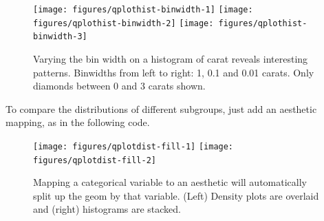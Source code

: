 \begin{Shaded}
\begin{Highlighting}[]
  \NormalTok{, } \NormalTok{, }
   \NormalTok{(}\NormalTok{,}\NormalTok{))}
  \NormalTok{, } \NormalTok{,}
   \NormalTok{(}\NormalTok{,}\NormalTok{))}
  \NormalTok{, } \NormalTok{,}
   \NormalTok{(}\NormalTok{,}\NormalTok{))}
\end{Highlighting}
\end{Shaded}

\begin{figure}
\texttt{[image: figures/qplothist-binwidth-1]} \texttt{[image: figures/qplothist-binwidth-2]} \texttt{[image: figures/qplothist-binwidth-3]} \caption{Varying the bin width on a histogram of carat reveals interesting patterns.  Binwidths from left to right: 1, 0.1 and 0.01 carats. Only diamonds between 0 and 3 carats shown.\label{fig:hist-binwidth}}
\end{figure}

To compare the distributions of different subgroups, just add an
aesthetic mapping, as in the following code.

\begin{Shaded}
\begin{Highlighting}[]
  \NormalTok{, } 
  \NormalTok{, } 
\end{Highlighting}
\end{Shaded}

\begin{figure}
\texttt{[image: figures/qplotdist-fill-1]} \texttt{[image: figures/qplotdist-fill-2]} \caption{Mapping a categorical variable to an aesthetic will automatically split up the geom by that variable.  (Left) Density plots are overlaid and (right) histograms are stacked.\label{fig:dist-fill}}
\end{figure}

